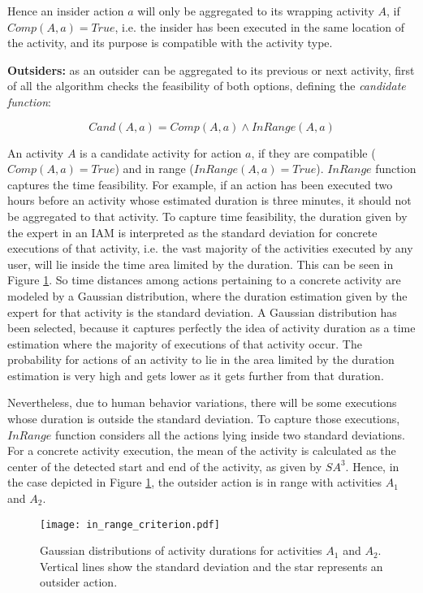 Hence an insider action $a$ will only be aggregated to its wrapping activity $A$, if $Comp(A, a) = True$, i.e. the insider has been executed in the same location of the activity, and its purpose is compatible with the activity type. 

\textbf{Outsiders:} as an outsider can be aggregated to its previous or next activity, first of all the algorithm checks the feasibility of both options, defining the \textit{candidate function}:

\begin{equation}
 Cand(A, a) = Comp(A, a) \wedge InRange(A, a)
\end{equation}

\noindent An activity $A$ is a candidate activity for action $a$, if they are compatible ($Comp(A, a) = True$) and in range ($InRange(A, a) = True$). $InRange$ function captures the time feasibility. For example, if an action has been executed two hours before an activity whose estimated duration is three minutes, it should not be aggregated to that activity. To capture time feasibility, the duration given by the expert in an IAM is interpreted as the standard deviation for concrete executions of that activity, i.e. the vast majority of the activities executed by any user, will lie inside the time area limited by the duration. This can be seen in Figure \ref{fig-in-range}. So time distances among actions pertaining to a concrete activity are modeled by a Gaussian distribution, where the duration estimation given by the expert for that activity is the standard deviation. A Gaussian distribution has been selected, because it captures perfectly the idea of activity duration as a time estimation where the majority of executions of that activity occur. The probability for actions of an activity to lie in the area limited by the duration estimation is very high and gets lower as it gets further from that duration.

Nevertheless, due to human behavior variations, there will be some executions whose duration is outside the standard deviation. To capture those executions, $InRange$ function considers all the actions lying inside two standard deviations. For a concrete activity execution, the mean of the activity is calculated as the center of the detected start and end of the activity, as given by $SA^3$. Hence, in the case depicted in Figure \ref{fig-in-range}, the outsider action is in range with activities $A_1$ and $A_2$. 

\begin{figure}[!t]
\centering
\texttt{[image: in\_range\_criterion.pdf]}
    \caption{Gaussian distributions of activity durations for activities $A_1$ and $A_2$. Vertical lines show the standard deviation and the star represents an outsider action.}
    \label{fig-in-range}
\end{figure}

